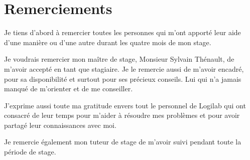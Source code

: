 \chapter*{Remerciements}
Je tiens d’abord à remercier toutes les personnes qui m’ont apporté leur aide d’une manière ou d’une autre durant les quatre mois de mon stage.

Je voudrais remercier mon maître de stage, Monsieur Sylvain Thénault, de m’avoir accepté en tant que stagiaire. Je le remercie aussi de m’avoir encadré, pour sa disponibilité et surtout pour ses précieux conseils. Lui qui n’a jamais manqué de m’orienter et de me conseiller.

J’exprime aussi toute ma gratitude envers tout le personnel de Logilab qui ont consacré de leur temps pour m'aider à résoudre mes problèmes et pour avoir partagé leur connaissances avec moi.

Je remercie également mon tuteur de stage de m’avoir suivi pendant toute la période de stage.